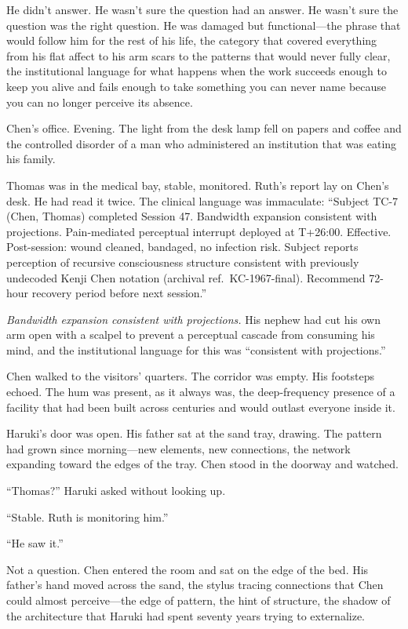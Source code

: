 He didn't answer. He wasn't sure the question had an answer. He wasn't sure the question was the right question. He was damaged but functional---the phrase that would follow him for the rest of his life, the category that covered everything from his flat affect to his arm scars to the patterns that would never fully clear, the institutional language for what happens when the work succeeds enough to keep you alive and fails enough to take something you can never name because you can no longer perceive its absence.

\scenebreak

Chen's office. Evening. The light from the desk lamp fell on papers and coffee and the controlled disorder of a man who administered an institution that was eating his family.

Thomas was in the medical bay, stable, monitored. Ruth's report lay on Chen's desk. He had read it twice. The clinical language was immaculate: ``Subject TC-7 (Chen, Thomas) completed Session 47. Bandwidth expansion consistent with projections. Pain-mediated perceptual interrupt deployed at T+26:00. Effective. Post-session: wound cleaned, bandaged, no infection risk. Subject reports perception of recursive consciousness structure consistent with previously undecoded Kenji Chen notation (archival ref.\ KC-1967-final). Recommend 72-hour recovery period before next session.''

\textit{Bandwidth expansion consistent with projections.} His nephew had cut his own arm open with a scalpel to prevent a perceptual cascade from consuming his mind, and the institutional language for this was ``consistent with projections.''

Chen walked to the visitors' quarters. The corridor was empty. His footsteps echoed. The hum was present, as it always was, the deep-frequency presence of a facility that had been built across centuries and would outlast everyone inside it.

Haruki's door was open. His father sat at the sand tray, drawing. The pattern had grown since morning---new elements, new connections, the network expanding toward the edges of the tray. Chen stood in the doorway and watched.

``Thomas?'' Haruki asked without looking up.

``Stable. Ruth is monitoring him.''

``He saw it.''

Not a question. Chen entered the room and sat on the edge of the bed. His father's hand moved across the sand, the stylus tracing connections that Chen could almost perceive---the edge of pattern, the hint of structure, the shadow of the architecture that Haruki had spent seventy years trying to externalize.

